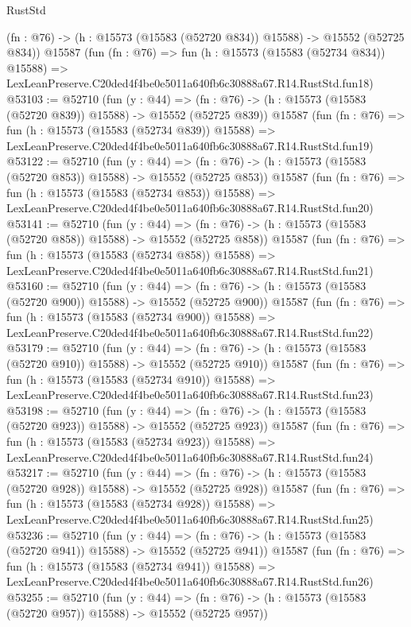 \begin{lexlean}{RustStd}
\begin{coremodule}
    (fn : @76) -> (h : @15573 (@15583 (@52720 @834)) @15588) -> @15552 (@52725 @834))
    @15587
    (fun (fn : @76) =>
    fun (h : @15573 (@15583 (@52734 @834)) @15588) =>
    LexLeanPreserve.C20ded4f4be0e5011a640fb6c30888a67.R14.RustStd.fun18)
@53103 := @52710
    (fun (y : @44) =>
    (fn : @76) -> (h : @15573 (@15583 (@52720 @839)) @15588) -> @15552 (@52725 @839))
    @15587
    (fun (fn : @76) =>
    fun (h : @15573 (@15583 (@52734 @839)) @15588) =>
    LexLeanPreserve.C20ded4f4be0e5011a640fb6c30888a67.R14.RustStd.fun19)
@53122 := @52710
    (fun (y : @44) =>
    (fn : @76) -> (h : @15573 (@15583 (@52720 @853)) @15588) -> @15552 (@52725 @853))
    @15587
    (fun (fn : @76) =>
    fun (h : @15573 (@15583 (@52734 @853)) @15588) =>
    LexLeanPreserve.C20ded4f4be0e5011a640fb6c30888a67.R14.RustStd.fun20)
@53141 := @52710
    (fun (y : @44) =>
    (fn : @76) -> (h : @15573 (@15583 (@52720 @858)) @15588) -> @15552 (@52725 @858))
    @15587
    (fun (fn : @76) =>
    fun (h : @15573 (@15583 (@52734 @858)) @15588) =>
    LexLeanPreserve.C20ded4f4be0e5011a640fb6c30888a67.R14.RustStd.fun21)
@53160 := @52710
    (fun (y : @44) =>
    (fn : @76) -> (h : @15573 (@15583 (@52720 @900)) @15588) -> @15552 (@52725 @900))
    @15587
    (fun (fn : @76) =>
    fun (h : @15573 (@15583 (@52734 @900)) @15588) =>
    LexLeanPreserve.C20ded4f4be0e5011a640fb6c30888a67.R14.RustStd.fun22)
@53179 := @52710
    (fun (y : @44) =>
    (fn : @76) -> (h : @15573 (@15583 (@52720 @910)) @15588) -> @15552 (@52725 @910))
    @15587
    (fun (fn : @76) =>
    fun (h : @15573 (@15583 (@52734 @910)) @15588) =>
    LexLeanPreserve.C20ded4f4be0e5011a640fb6c30888a67.R14.RustStd.fun23)
@53198 := @52710
    (fun (y : @44) =>
    (fn : @76) -> (h : @15573 (@15583 (@52720 @923)) @15588) -> @15552 (@52725 @923))
    @15587
    (fun (fn : @76) =>
    fun (h : @15573 (@15583 (@52734 @923)) @15588) =>
    LexLeanPreserve.C20ded4f4be0e5011a640fb6c30888a67.R14.RustStd.fun24)
@53217 := @52710
    (fun (y : @44) =>
    (fn : @76) -> (h : @15573 (@15583 (@52720 @928)) @15588) -> @15552 (@52725 @928))
    @15587
    (fun (fn : @76) =>
    fun (h : @15573 (@15583 (@52734 @928)) @15588) =>
    LexLeanPreserve.C20ded4f4be0e5011a640fb6c30888a67.R14.RustStd.fun25)
@53236 := @52710
    (fun (y : @44) =>
    (fn : @76) -> (h : @15573 (@15583 (@52720 @941)) @15588) -> @15552 (@52725 @941))
    @15587
    (fun (fn : @76) =>
    fun (h : @15573 (@15583 (@52734 @941)) @15588) =>
    LexLeanPreserve.C20ded4f4be0e5011a640fb6c30888a67.R14.RustStd.fun26)
@53255 := @52710
    (fun (y : @44) =>
    (fn : @76) -> (h : @15573 (@15583 (@52720 @957)) @15588) -> @15552 (@52725 @957))

\end{coremodule}
\end{lexlean}
